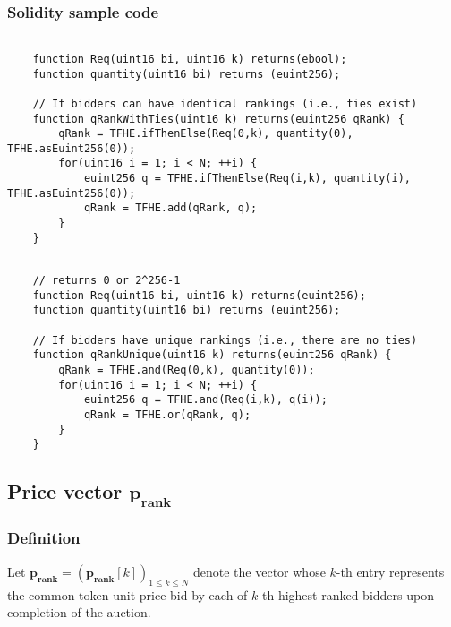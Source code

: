 \subsubsection{Solidity sample code}

\begin{lstlisting}[language=Solidity]

    function Req(uint16 bi, uint16 k) returns(ebool);
    function quantity(uint16 bi) returns (euint256);

    // If bidders can have identical rankings (i.e., ties exist)
    function qRankWithTies(uint16 k) returns(euint256 qRank) {
        qRank = TFHE.ifThenElse(Req(0,k), quantity(0), TFHE.asEuint256(0));
        for(uint16 i = 1; i < N; ++i) {
            euint256 q = TFHE.ifThenElse(Req(i,k), quantity(i), TFHE.asEuint256(0));
            qRank = TFHE.add(qRank, q);
        }
    }
\end{lstlisting}

\begin{lstlisting}[language=Solidity]

    // returns 0 or 2^256-1
    function Req(uint16 bi, uint16 k) returns(euint256);
    function quantity(uint16 bi) returns (euint256);

    // If bidders have unique rankings (i.e., there are no ties)
    function qRankUnique(uint16 k) returns(euint256 qRank) {
        qRank = TFHE.and(Req(0,k), quantity(0));
        for(uint16 i = 1; i < N; ++i) {
            euint256 q = TFHE.and(Req(i,k), q(i));
            qRank = TFHE.or(qRank, q);
        }
    }    
\end{lstlisting}


\subsection{Price vector $\mathbf{p_{rank}}$}

\subsubsection{Definition}

Let $\mathbf{p_{rank}} = (\mathbf{p_{rank}}[k])_{1 \le k \le N}$ denote the vector whose $k$-th entry represents the common token unit price bid by each of $k$-th highest-ranked bidders upon completion of the auction.

